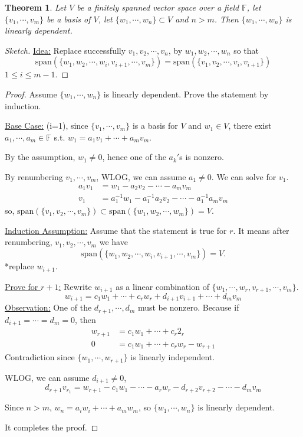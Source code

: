 \documentclass[12pt]{article}
\newtheorem{theorem}{Theorem}[subsection]
\newcommand{\Span}{\mathrm{span}}
\newcommand{\mF}{{\mathbb{F}}}
\begin{document}
	\begin{theorem}
		Let $V$ be a finitely spanned vector space over a field $\mF$, let 
		$\{v_1, \cdots, v_m\}$ be a basis of $V$, let $\{w_1, \cdots, w_n\}
		\subset V$ and $n > m$. Then $\{w_1, \cdots, w_n\}$ is linearly 
		dependent. 
	\end{theorem}
	\begin{proof}[Sketch]
		\underline{Idea:} 
		Replace successfully $v_1, v_2, \cdots,v_n$, by $w_1, w_2,\cdots,w_n$
		so that 
		\[
			\Span(\{w_1, w_2, \cdots, w_i, v_{i+1}, \cdots, v_m\})
			= \Span(\{v_1, v_2,\cdots,v_i, v_{i+1}\})
		\]
		$1\leq i\leq m-1$. 
	\end{proof}
	\begin{proof}
		Assume $\{w_1, \cdots, w_n\}$ is linearly dependent. Prove the 
		statement by induction. 

		\underline{Base Case:} (i=1), since $\{v_1, \cdots, v_m\}$ is a basis
		 for $V$ and $w_1 \in V$, there exist $a_1, \cdots, a_m \in \mF$ s.t.
		 $w_1 = a_1v_1+\cdots+a_mv_m$. 

		 By the assumption, $w_1 \neq 0$, hence one of the $a_k'$s is nonzero. 

		 By renumbering $v_1, \cdots, v_m$, WLOG, we can assume $a_1\neq 0$. 
		 We can solve for $v_1$. 
		\begin{align*}
			 a_1v_1 &= w_1 - a_2v_2 - \cdots - a_mv_m \\
			 v_1 &= a_1^{-1}w_1 - a_1^{-1}a_2v_2-\cdots-a_1^{-1}a_mv_m
		\end{align*}
		so, $\Span(\{v_1, v_2,\cdots, v_m\}) \subset \Span(\{w_1, w_2,
		\cdots, w_m\}) = V$. 

		\underline{Induction Assumption:}
		Assume that the statement is true for $r$. It means after renumbering, 
		$v_1,v_2,\cdots,v_m$ we have 
		\[
			 \Span(\{w_1, w_2, \cdots, w_i, v_{i+1}, \cdots, v_m\})
			 = V. 
		\]
		*replace $w_{i+1}$. 

		\underline{Prove for $r+1$:} 
		Rewrite $w_{i+1}$ as a linear combination of $\{w_1, \cdots, w_r,
		v_{r+1}, \cdots, v_m\}$. 
		\[
			 w_{i+1} = c_1w_1 + \cdots + c_rw_r + d_{i+1}v_{i+1} + \cdots
			 + d_mv_m
		\]
		\underline{Observation:} One of the $d_{r+1}, \cdots, d_m$ must be 
		nonzero. Because if $d_{i+1} = \cdots = d_m = 0$, then 
		\begin{align*}
			w_{r+1} &= c_1w_1 + \cdots + c_r2_r\\
			0&= c_1w_1 + \cdots + c_r w_r - w_{r+1}
		\end{align*}
		Contradiction since $\{w_1, \cdots, w_{r+1}\}$ is linearly independent.
		
		WLOG, we can assume $d_{i+1} \neq 0$,
		\[
			d_{r+1} v_{r_1} = w_{r+1} - c_1w_1-\cdots-a_rw_r-d_{r+2}v_{r+2}
			-\cdots-d_mv_m
		\]
		

		Since $n>m$, $w_n = a_iw_i + \cdots + a_mw_m$, so $\{w_1, \cdots, w_n\}$
		 is linearly dependent. 
		
		It completes the proof. 
	\end{proof}
\end{document}

